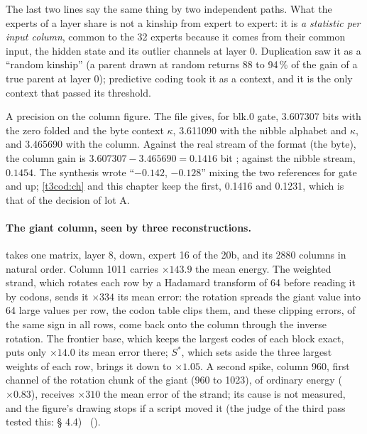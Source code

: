 The last two lines say the same thing by two independent paths. What the experts of a layer share is not a kinship from expert to expert: it is \emph{a statistic per input column}, common to the 32 experts because it comes from their common input, the hidden state and its outlier channels at layer 0. Duplication saw it as a ``random kinship'' (a parent drawn at random returns 88 to 94\,\% of the gain of a true parent at layer 0); predictive coding took it as a context, and it is the only context that passed its threshold.

A precision on the column figure. The file gives, for blk.0 gate, \num{3.607307} bits with the zero folded and the byte context $\kappa$, \num{3.611090} with the nibble alphabet and $\kappa$, and \num{3.465690} with the column. Against the real stream of the format (the byte), the column gain is $3.607307 - 3.465690 = 0.1416$ bit \calc; against the nibble stream, $0.1454$. The synthesis wrote ``$-0.142$, $-0.128$'' mixing the two references for gate and up; \cref{t3cod:ch} and this chapter keep the first, \num{0.1416} and \num{0.1231}, which is that of the decision of lot A.

\begin{figure}[tbp]
\centering
\GrapheSynthColonnes
{}
\label{fig:t3-synth-colonnes}
\end{figure}

\paragraph{The giant column, seen by three reconstructions.}  takes one matrix, layer 8, down, expert 16 of the 20b, and its \num{2880} columns in natural order. Column 1011 carries $\times 143.9$ the mean energy. The weighted strand, which rotates each row by a Hadamard transform of 64 before reading it by codons, sends it $\times 334$ its mean error: the rotation spreads the giant value into 64 large values per row, the codon table clips them, and these clipping errors, of the same sign in all rows, come back onto the column through the inverse rotation. The frontier base, which keeps the largest codes of each block exact, puts only $\times 14.0$ its mean error there; $S^{*}$, which sets aside the three largest weights of each row, brings it down to $\times 1.05$. A second spike, column 960, first channel of the rotation chunk of the giant (960 to 1023), of ordinary energy ($\times 0.83$), receives $\times 310$ the mean error of the strand; its cause is not measured, and the figure's drawing stops if a script moved it (the judge of the third pass tested this:  § 4.4) \mes~().

